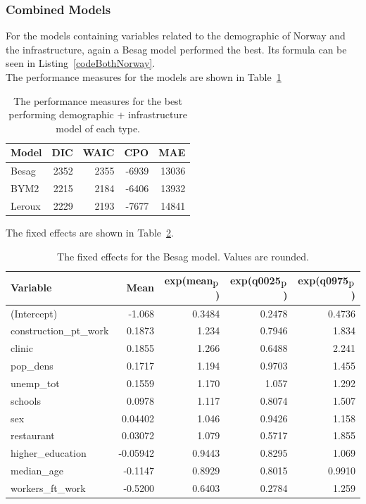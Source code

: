 \subsubsection{Combined Models}
For the models containing variables related to the demographic of Norway and the infrastructure, again a Besag model performed the best. Its formula can be seen in Listing~\ref{codeBothNorway}. \\
The performance measures for the models are shown in Table~\ref{bothNorway}
\begin{table}[H] 
\caption{The performance measures for the best performing demographic + infrastructure model of each type. \label{bothNorway}}
\begin{tabular}{l r r r r}
\toprule
\textbf{Model}	& \textbf{DIC}	& \textbf{WAIC} & \textbf{CPO} & \textbf{MAE} \\
\midrule
Besag  & 2352 & 2355 & -6939 & 13036 \\
BYM2 & 2215 & 2184 & -6406 & 13932\\
Leroux &  2229 & 2193 & -7677 & 14841\\
\bottomrule
\end{tabular}
\end{table}
The fixed effects are shown in Table~\ref{fixedAllNorway}.
\begin{table}[H] 
\caption{The fixed effects for the Besag model. Values are rounded. \label{fixedAllNorway}}
\begin{tabular}{l r r r r}
\toprule
\textbf{Variable}	& \textbf{Mean}	& \textbf{exp(mean$_{\hbox{p}}$)} & \textbf{exp(q0025$_{\hbox{p}}$)} & \textbf{exp(q0975$_{\hbox{p}}$)} \\
\midrule
(Intercept) & -1.068 & 0.3484 & 0.2478 & 0.4736\\
construction\_pt\_work & 0.1873 & 1.234 & 0.7946 & 1.834 \\
clinic & 0.1855 & 1.266 & 0.6488 & 2.241 \\
pop\_dens & 0.1717 & 1.194 & 0.9703 & 1.455 \\
unemp\_tot & 0.1559 & 1.170 & 1.057 & 1.292 \\
schools & 0.0978 & 1.117 & 0.8074 & 1.507 \\
sex & 0.04402 & 1.046 & 0.9426 & 1.158 \\
restaurant & 0.03072 & 1.079 & 0.5717 & 1.855 \\
higher\_education & -0.05942 & 0.9443 & 0.8295 & 1.069 \\
median\_age & -0.1147 & 0.8929 & 0.8015 & 0.9910 \\
workers\_ft\_work & -0.5200 & 0.6403 & 0.2784 & 1.259 \\
\bottomrule
\end{tabular}
\end{table}
